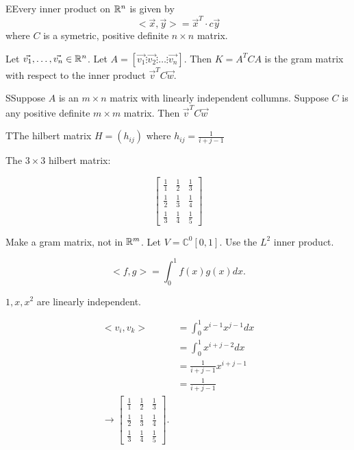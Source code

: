   \begin{theorem}
    EEvery inner product on $\mathbb{R}^{n}$ is given by 
    \begin{equation}
      <\vec{x},\vec{y}> = \vec{x}^{T}\cdot c\vec{y}
    \end{equation}
    where $C$ is a symetric, positive definite $n\times n$ matrix.
  \end{theorem}

  Let $\vec{v_1},\ldots,\vec{v_n}\in\mathbb{R}^{n}$. Let $A=[\vec{v_1}\vdots \vec{v_2} \vdots \ldots \vdots \vec{v_n}]$. Then $K=A^{T}CA$ is the gram matrix with respect to the inner product $\vec{v}^{T}C\vec{w}$.

  \begin{theorem}
    SSuppose $A$ is an $m\times n$ matrix with linearly independent collumns. Suppose $C$ is any positive definite $m\times m$ matrix. Then $\vec{v}^{T}C\vec{w}$
  \end{theorem}

  \begin{definition}
    TThe hilbert matrix $H=(h_{ij})$ where $h_{ij}=\frac{1}{i+j-1}$
  \end{definition}

  The $3\times 3$ hilbert matrix:

  \begin{equation}
    \begin{bmatrix} 
      \frac{1}{1}&\frac{1}{2}&\frac{1}{3}\\
      \frac{1}{2}&\frac{1}{3}&\frac{1}{4}\\
      \frac{1}{3}&\frac{1}{4}&\frac{1}{5}
    \end{bmatrix} 
  \end{equation}

  \begin{problem}
    Make a gram matrix, not in $\mathbb{R}^{m}$. Let $V=\mathbb{C}^{0}[0,1]$. Use the $L^{2}$ inner product.

    \begin{equation}
      <f,g> = \int_0^{1}f(x)g(x)dx
    .\end{equation}

    $1,x,x^2$ are linearly independent.

    \begin{align}
      <v_i,v_k> &= \int_0^{1}x^{i-1}x^{j-1}dx \\
                &=\int_0^{1}x^{i+j-2}dx\\
                &=\frac{1}{i+j-1}x^{i+j-1}\\
                &=\frac{1}{i+j-1}\\
                \to \begin{bmatrix} 
                  \frac{1}{1}&\frac{1}{2}&\frac{1}{3}\\
                  \frac{1}{2}&\frac{1}{3}&\frac{1}{4}\\
                  \frac{1}{3}&\frac{1}{4}&\frac{1}{5}
                \end{bmatrix} 
    .\end{align}
  \end{problem}
	\newpage
